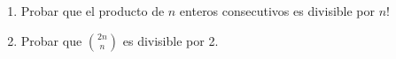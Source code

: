 \begin{enunciado}{\ejercicio}
        \begin{enumerate}[label=\alph*)] 
         \item Probar que el producto de $n$ enteros consecutivos es divisible por $n!$ 
         \item Probar que $\binom{2n}{n}$ es divisible por 2.
         \end{enumerate}
\end{enunciado}
\hacer
